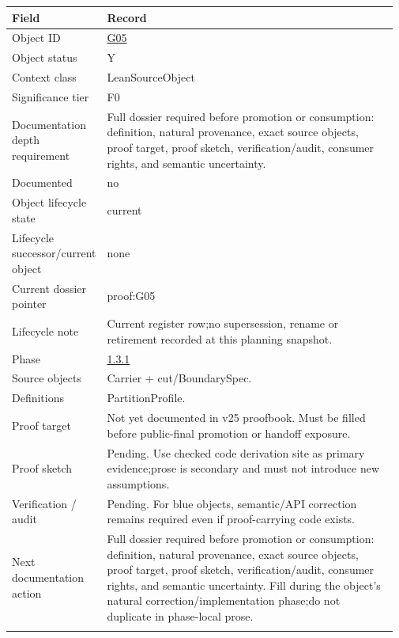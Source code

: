 \begin{longtable}{L{0.16\linewidth} L{0.81\linewidth}}
\hline
\textbf{Field} & \textbf{Record}\\
\hline
Object ID & \hyperlink{object-row-G05}{G05}\\
\hline\addlinespace[0.20em]
Object status & Y\\
\hline\addlinespace[0.20em]
Context class & LeanSourceObject\\
\hline\addlinespace[0.20em]
Significance tier & F0\\
\hline\addlinespace[0.20em]
Documentation depth requirement & Full dossier required before promotion or consumption: definition, natural provenance, exact source objects, proof target, proof sketch, verification/\allowbreak{}audit, consumer rights, and semantic uncertainty.\\
\hline\addlinespace[0.20em]
Documented & no\\
\hline\addlinespace[0.20em]
Object lifecycle state & current\\
\hline\addlinespace[0.20em]
Lifecycle successor/\allowbreak{}current object & none\\
\hline\addlinespace[0.20em]
Current dossier pointer & proof:G05\\
\hline\addlinespace[0.20em]
Lifecycle note & Current register row;\newline no supersession, rename or retirement recorded at this planning snapshot.\\
\hline\addlinespace[0.20em]
Phase & \hyperlink{phase-row-1-3-1}{1.3.1}\\
\hline\addlinespace[0.20em]
Source objects & Carrier + cut/\allowbreak{}BoundarySpec.\\
\hline\addlinespace[0.20em]
Definitions & PartitionProfile.\\
\hline\addlinespace[0.20em]
Proof target & Not yet documented in v25 proofbook. Must be filled before public-final promotion or handoff exposure.\\
\hline\addlinespace[0.20em]
Proof sketch & Pending. Use checked code derivation site as primary evidence;\newline prose is secondary and must not introduce new assumptions.\\
\hline\addlinespace[0.20em]
Verification /\allowbreak{} audit & Pending. For blue objects, semantic/\allowbreak{}API correction remains required even if proof-carrying code exists.\\
\hline\addlinespace[0.20em]
Next documentation action & Full dossier required before promotion or consumption: definition, natural provenance, exact source objects, proof target, proof sketch, verification/\allowbreak{}audit, consumer rights, and semantic uncertainty. Fill during the object's natural correction/\allowbreak{}implementation phase;\newline do not duplicate in phase-local prose.\\
\hline\addlinespace[0.20em]
\end{longtable}
